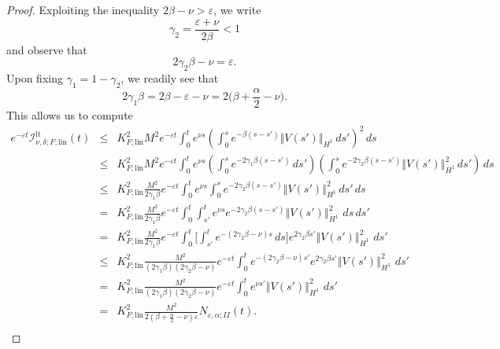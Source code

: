 \documentclass[10pt]{articleHJ}
\newcommand{\e}{\ensuremath{\varepsilon}}
\newcommand{\norm}[1]{\left\Vert#1\right\Vert}		%
\numberwithin{equation}{section}
\begin{document}
\begin{proof}
Exploiting the inequality
$2\beta - \nu >  \e$,    
we write
\begin{equation}
\gamma_2 = \frac{\e + \nu}{2 \beta} < 1
\end{equation}
and observe that
\begin{equation}
2 \gamma_2 \beta - \nu = \e.
\end{equation}
Upon fixing
$\gamma_1 = 1 - \gamma_2$,
we readily see that
\begin{equation}
2 \gamma_1 \beta
 = 2 \beta - \e - \nu
 = 2\big(\beta + \frac{\alpha}{2} - \nu \big).
\end{equation}
This allows us to compute
\begin{equation}
\begin{array}{lcl}
 e^{-\e t} \mathcal{I}^{\mathrm{lt}}_{\nu,\delta ; F;\mathrm{lin}}(t)
  & \le &
  K_{F;\mathrm{lin}}^2 M^2 e^{-\e t}
  \int_0^t e^{\nu s}
  \left(
     \int_0^{s} e^{- \beta(s - s') }
         \norm{V(s')}_{H^1} \, ds' \right)^2  \, ds
\\[0.2cm]
& \le &
  K_{F;\mathrm{lin}}^2 M^2 e^{-\e t}
  \int_0^t e^{\nu s}
  \left(
     \int_0^{s} e^{- 2 \gamma_1 \beta(s - s') } \, ds' \right)
  \left(\int_0^s e^{-2 \gamma_2 \beta(s - s') }
         \norm{V(s')}^2_{H^1} \, ds' \right)  \, ds
\\[0.2cm]
&\le&
  K_{F;\mathrm{lin}}^2 \frac{M^2}{2 \gamma_1 \beta} e^{-\e t}
     \int_0^{t} e^{\nu s}
       \int_0^s e^{-2 \gamma_2 \beta(s - s')} \norm{V(s')}_{H^1}^2 \, ds' \, ds
\\[0.2cm]
& = &
    K_{F;\mathrm{lin}}^2 \frac{M^2}{2 \gamma_1 \beta} e^{-\e t}
     \int_0^{t} \int_{s'}^t e^{\nu s}
        e^{-2 \gamma_2 \beta(s - s')} \norm{V(s')}_{H^1}^2 \,  \, ds \, ds'
\\[0.2cm]
& = &
      K_{F;\mathrm{lin}}^2 \frac{M^2}{2 \gamma_1 \beta} e^{-\e t}
     \int_0^{t}  \Big[ \int_{s'}^t  e^{- (2 \gamma_2 \beta - \nu) s }  \, ds \Big]
        e^{ 2 \gamma_2 \beta s'} \norm{V(s')}_{H^1}^2 \,  \, ds'
\\[0.2cm]
& \le &
        K_{F;\mathrm{lin}}^2 \frac{M^2}{(2 \gamma_1 \beta)( 2 \gamma_2 \beta - \nu)}
         e^{-\e t}
     \int_0^{t}  e^{- (2 \gamma_2 \beta - \nu )s'}
        e^{ 2 \gamma_2 \beta s'} \norm{V(s')}_{H^1}^2 \,  \, ds'
\\[0.2cm]
& = &
  K_{F;\mathrm{lin}}^2 \frac{M^2}{(2 \gamma_1 \beta)( 2 \gamma_2 \beta - \nu)}
     e^{-\e t}
     \int_0^{t} e^{\nu s'}  \norm{V(s')}_{H^1}^2 \,  \, ds'
\\[0.2cm]
& = &
  K_{F;\mathrm{lin}}^2 \frac{M^2}{2(\beta  + \frac{\alpha}{2} - \nu)
    \e} N_{\e, \alpha;II}(t).
\\[0.2cm]
\end{array}
\end{equation}
\end{proof}
\end{document}
